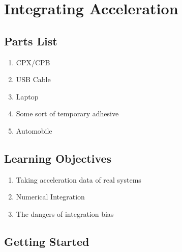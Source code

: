 \newpage

\section{Integrating Acceleration}

\subsection{Parts List}

\begin{enumerate}[itemsep=-5pt]
\item CPX/CPB
\item USB Cable
\item Laptop
\item Some sort of temporary adhesive
\item Automobile
\end{enumerate}

\subsection{Learning Objectives}
\begin{enumerate}[itemsep=-5pt]
\item Taking acceleration data of real systems
\item Numerical Integration 
\item The dangers of integration bias
\end{enumerate}

\subsection{Getting Started}

